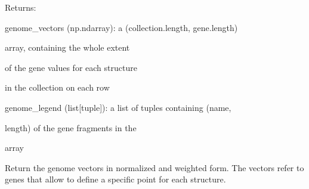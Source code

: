 \documentclass[letterpaper,10pt,english]{sphinxmanual}
\begin{document}
\begin{fulllineitems}
\begin{fulllineitems}
\begin{DUlineblock}{0em}
\item[] Returns:
\item[]
\begin{DUlineblock}{\DUlineblockindent}
\item[] genome\_vectors (np.ndarray): a (collection.length, gene.length)
\item[]
\begin{DUlineblock}{\DUlineblockindent}
\item[] array, containing the whole extent
\item[] of the gene values for each structure
\item[] in the collection on each row
\end{DUlineblock}
\item[] genome\_legend (list{[}tuple{]}): a list of tuples containing (name,
\item[]
\begin{DUlineblock}{\DUlineblockindent}
\item[] length) of the gene fragments in the
\item[] array
\end{DUlineblock}
\end{DUlineblock}
\end{DUlineblock}

\end{fulllineitems}


\begin{fulllineitems}
\label{doctree/soprano.analyse.phylogen.phylogenclust:soprano.analyse.phylogen.phylogenclust.PhylogenCluster.get_genome_vectors_norm}
Return the genome vectors in normalized and weighted form.
The vectors refer to genes that allow to define a specific point for
each structure.


\end{fulllineitems}
\end{fulllineitems}
\end{document}
